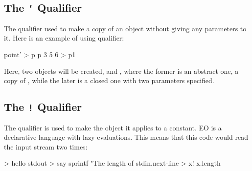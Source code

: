 \documentclass[12pt]{book}
\begin{document}
\subsection{The \texttt{`} Qualifier} \label{subsec:"`"-qualifier}
The  qualifier used to make a copy of an object without giving any parameters to it. Here is an example of using  qualifier:
\begin{ffcode}
point' > p
p 3 5 6 > p1
\end{ffcode}
Here, two objects will be created,  and , where the former is an abstract one, a copy of , while the later is a closed one with two parameters specified.

\subsection{The \texttt{!} Qualifier} \label{subsec:"!"-qualifier}
The \ff{!} qualifier is used to make the object it applies to a constant. EO is a declarative language with lazy evaluations. This means that this code would read the input stream two times:
\begin{ffcode}
[] > hello
  stdout > say
    sprintf
      "The length of %
      stdin.next-line > x!
      x.length
\end{ffcode}
\end{document}
